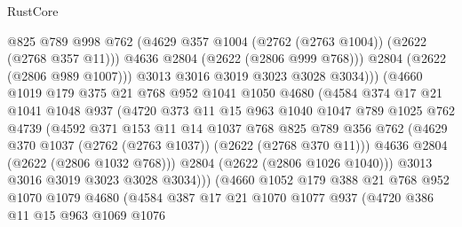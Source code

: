\begin{lexlean}{RustCore}
\begin{coremodule}
                          @825
                          @789
                          @998
                          @762
                          (@4629 @357 @1004 (@2762 (@2763 @1004)) (@2622 (@2768 @357 @11)))
                          @4636
                          @2804
                          (@2622 (@2806 @999 @768)))
                        @2804
                        (@2622 (@2806 @989 @1007)))
                      @3013
                      @3016
                      @3019
                      @3023
                      @3028
                      @3034)))
                (@4660
                  @1019
                  @179
                  @375
                  @21
                  @768
                  @952
                  @1041
                  @1050
                  @4680
                  (@4584
                    @374
                    @17
                    @21
                    @1041
                    @1048
                    @937
                    (@4720
                      @373
                      @11
                      @15
                      @963
                      @1040
                      @1047
                      @789
                      @1025
                      @762
                      @4739
                      (@4592
                        @371
                        @153
                        @11
                        @14
                        @1037
                        @768
                        @825
                        @789
                        @356
                        @762
                        (@4629 @370 @1037 (@2762 (@2763 @1037)) (@2622 (@2768 @370 @11)))
                        @4636
                        @2804
                        (@2622 (@2806 @1032 @768)))
                      @2804
                      (@2622 (@2806 @1026 @1040)))
                    @3013
                    @3016
                    @3019
                    @3023
                    @3028
                    @3034)))
              (@4660
                @1052
                @179
                @388
                @21
                @768
                @952
                @1070
                @1079
                @4680
                (@4584
                  @387
                  @17
                  @21
                  @1070
                  @1077
                  @937
                  (@4720
                    @386
                    @11
                    @15
                    @963
                    @1069
                    @1076

\end{coremodule}
\end{lexlean}
